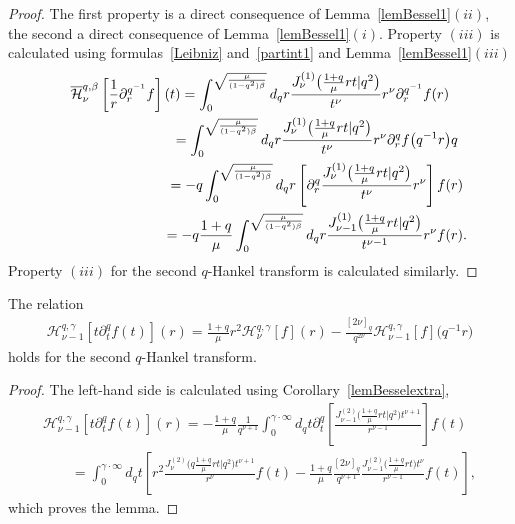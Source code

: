 \documentclass[pdftex]{sigma}
\newcommand{\cH}{\mathcal{H}}
\numberwithin{equation}{section}
\begin{document}
\begin{proof}
The f\/irst property is a direct consequence of Lemma~\ref{lemBessel1}$(ii)$, the second a direct consequence of Lemma~\ref{lemBessel1}$(i)$. Property $(iii)$ is calculated using formulas~\eqref{Leibniz} and~\eqref{partint1} and Lem\-ma~\ref{lemBessel1}$(iii)$	
\begin{gather*}
\overline{ \cH}_\nu^{q,\beta}\left[\frac{1}{r}\partial_r^{q^{-1}}f\right](t)=
\int_0^{\sqrt{\frac{\mu}{(1-q^2)\beta}}}d_qr\frac{J_\nu^{(1)}\big(\frac{1+q}{\mu}rt|q^2\big)}{t^{\nu}}r^{\nu}\partial_r^{q^{-1}}f(r)\\
\hphantom{\overline{ \cH}_\nu^{q,\beta}\left[\frac{1}{r}\partial_r^{q^{-1}}f\right](t)}{} =\int_0^{\sqrt{\frac{\mu}{(1-q^2)\beta}}}d_qr\frac{J_\nu^{(1)}\big(\frac{1+q}{\mu}rt|q^2\big)}{t^{\nu}}r^{\nu}\partial_r^{q}f\big(q^{-1}r\big)q\\
\hphantom{\overline{ \cH}_\nu^{q,\beta}\left[\frac{1}{r}\partial_r^{q^{-1}}f\right](t)}{}
=-q\int_0^{\sqrt{\frac{\mu}{(1-q^2)\beta}}}d_qr\left[\partial_r^q\frac{J_\nu^{(1)}\big(\frac{1+q}{\mu}rt|q^2\big)}{t^{\nu}}r^{\nu}\right]f(r)\\
\hphantom{\overline{ \cH}_\nu^{q,\beta}\left[\frac{1}{r}\partial_r^{q^{-1}}f\right](t)}{}
=-q\frac{1+q}{\mu}\int_0^{\sqrt{\frac{\mu}{(1-q^2)\beta}}}d_qr\frac{J_{\nu-1}^{(1)}\big(\frac{1+q}{\mu}rt|q^2\big)}{t^{\nu-1}}r^{\nu}f(r).
\end{gather*}
Property $(iii)$ for the second $q$-Hankel transform is calculated similarly.
\end{proof}

\begin{lemma}
\label{lemHankelextra}
The relation
\begin{gather*}
\cH_{\nu-1}^{q,\gamma}\left[t\partial_t^qf(t)\right](r)=
\frac{1+q}{\mu}r^2\cH_\nu^{q,\gamma}[f](r)-\frac{[2\nu]_q}{q^{2\nu}}\cH_{\nu-1}^{q,\gamma}[f]\big(q^{-1}r\big)
\end{gather*}
holds for the second $q$-Hankel transform.
\end{lemma}

\begin{proof}
The left-hand side is calculated using Corollary~\ref{lemBesselextra},
\begin{gather*}
\cH_{\nu-1}^{q,\gamma}\left[t\partial_t^qf(t)\right](r)=-\frac{1+q}{\mu }\frac{1}{q^{\nu+1}}\int_0^{\gamma\cdot\infty}d_qt\partial_t^q\left[\frac{J_{\nu-1}^{(2)}\big(\frac{1+q}{\mu}rt|q^2\big)
t^{\nu+1}}{r^{\nu-1}}\right]f(t)\\
\qquad{}
 = \int_0^{\gamma\cdot\infty}d_qt\left[r^2\frac{J_\nu^{(2)}\big(q\frac{1+q}{\mu}rt|q^2\big)t^{\nu+1}}{r^\nu}f(t)-\frac{1+q}{\mu }\frac{[2\nu]_q}{q^{\nu+1}}\frac{J_{\nu-1}^{(2)}\big(\frac{1+q}{\mu}rt\big)t^{\nu}}{r^{\nu-1}}f(t)\right],
\end{gather*}
which proves the lemma.
\end{proof}
\end{document}
